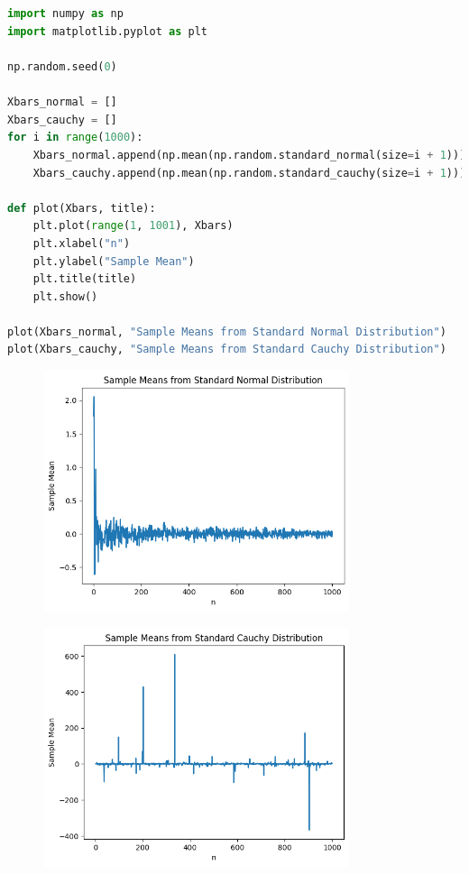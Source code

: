 \documentclass[11pt,a4paper,margin=1in]{article}
\begin{document}
\section{}
\begin{lstlisting}[language=python]
import numpy as np
import matplotlib.pyplot as plt

np.random.seed(0)

Xbars_normal = []
Xbars_cauchy = []
for i in range(1000):
    Xbars_normal.append(np.mean(np.random.standard_normal(size=i + 1)))
    Xbars_cauchy.append(np.mean(np.random.standard_cauchy(size=i + 1)))

def plot(Xbars, title):
    plt.plot(range(1, 1001), Xbars)
    plt.xlabel("n")
    plt.ylabel("Sample Mean")
    plt.title(title)
    plt.show()

plot(Xbars_normal, "Sample Means from Standard Normal Distribution")
plot(Xbars_cauchy, "Sample Means from Standard Cauchy Distribution")
\end{lstlisting}
\begin{figure}[H]
    \centering
    \includegraphics[width=0.8\textwidth]{4norm.png}
\end{figure}
\begin{figure}[H]
    \centering
    \includegraphics[width=0.8\textwidth]{4cauchy.png}
\end{figure}
\end{document}
